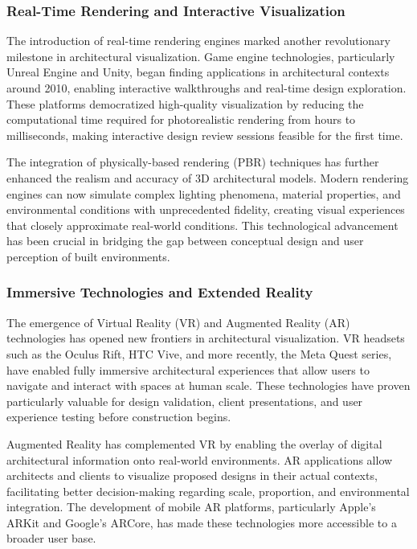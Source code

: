 \documentclass[12pt,a4paper]{book}
\begin{document}
\subsubsection{Real-Time Rendering and Interactive Visualization}
\label{subsubsec:realtime_rendering}

The introduction of real-time rendering engines marked another revolutionary milestone in architectural visualization. Game engine technologies, particularly Unreal Engine and Unity, began finding applications in architectural contexts around 2010, enabling interactive walkthroughs and real-time design exploration. These platforms democratized high-quality visualization by reducing the computational time required for photorealistic rendering from hours to milliseconds, making interactive design review sessions feasible for the first time.

The integration of physically-based rendering (PBR) techniques has further enhanced the realism and accuracy of 3D architectural models. Modern rendering engines can now simulate complex lighting phenomena, material properties, and environmental conditions with unprecedented fidelity, creating visual experiences that closely approximate real-world conditions. This technological advancement has been crucial in bridging the gap between conceptual design and user perception of built environments.

\subsubsection{Immersive Technologies and Extended Reality}
\label{subsubsec:immersive_technologies}

The emergence of Virtual Reality (VR) and Augmented Reality (AR) technologies has opened new frontiers in architectural visualization. VR headsets such as the Oculus Rift, HTC Vive, and more recently, the Meta Quest series, have enabled fully immersive architectural experiences that allow users to navigate and interact with spaces at human scale. These technologies have proven particularly valuable for design validation, client presentations, and user experience testing before construction begins.

Augmented Reality has complemented VR by enabling the overlay of digital architectural information onto real-world environments. AR applications allow architects and clients to visualize proposed designs in their actual contexts, facilitating better decision-making regarding scale, proportion, and environmental integration. The development of mobile AR platforms, particularly Apple's ARKit and Google's ARCore, has made these technologies more accessible to a broader user base.
\end{document}
